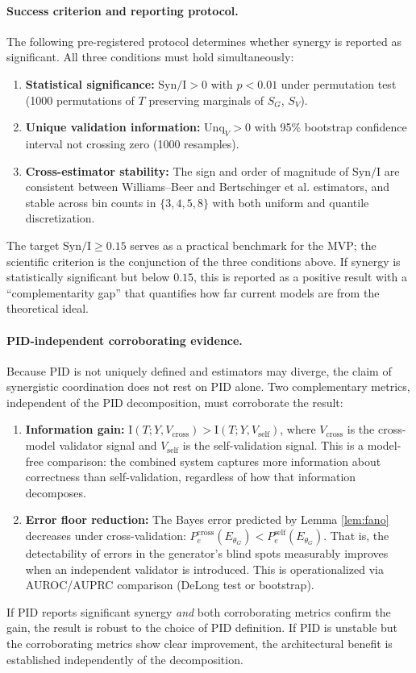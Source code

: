 \documentclass[11pt,a4paper]{article}
\theoremstyle{remark}
\newcommand{\Syn}{\mathrm{Syn}}
\newcommand{\Unq}{\mathrm{Unq}}
\newcommand{\MI}{\mathrm{I}}
\begin{document}
\paragraph{Success criterion and reporting protocol.} The following pre-registered protocol determines whether synergy is reported as significant. All three conditions must hold simultaneously:
\begin{enumerate}
  \item \textbf{Statistical significance:} $\Syn / \MI > 0$ with $p < 0.01$ under permutation test (1000 permutations of $T$ preserving marginals of $S_G$, $S_V$).
  \item \textbf{Unique validation information:} $\Unq_V > 0$ with 95\% bootstrap confidence interval not crossing zero (1000 resamples).
  \item \textbf{Cross-estimator stability:} The sign and order of magnitude of $\Syn / \MI$ are consistent between Williams--Beer \cite{williams2010pid} and Bertschinger et al. \cite{bertschinger2014pid} estimators, and stable across bin counts in $\{3, 4, 5, 8\}$ with both uniform and quantile discretization.
\end{enumerate}
The target $\Syn / \MI \geq 0.15$ serves as a practical benchmark for the MVP; the scientific criterion is the conjunction of the three conditions above. If synergy is statistically significant but below $0.15$, this is reported as a positive result with a ``complementarity gap'' that quantifies how far current models are from the theoretical ideal.

\paragraph{PID-independent corroborating evidence.} Because PID is not uniquely defined and estimators may diverge, the claim of synergistic coordination does not rest on PID alone. Two complementary metrics, independent of the PID decomposition, must corroborate the result:
\begin{enumerate}
  \item \textbf{Information gain:} $\MI(T; Y, V_{\mathrm{cross}}) > \MI(T; Y, V_{\mathrm{self}})$, where $V_{\mathrm{cross}}$ is the cross-model validator signal and $V_{\mathrm{self}}$ is the self-validation signal. This is a model-free comparison: the combined system captures more information about correctness than self-validation, regardless of how that information decomposes.
  \item \textbf{Error floor reduction:} The Bayes error predicted by Lemma \ref{lem:fano} decreases under cross-validation: $P_e^{\mathrm{cross}}(E_{\theta_G}) < P_e^{\mathrm{self}}(E_{\theta_G})$. That is, the detectability of errors in the generator's blind spots measurably improves when an independent validator is introduced. This is operationalized via AUROC/AUPRC comparison (DeLong test or bootstrap).
\end{enumerate}
If PID reports significant synergy \emph{and} both corroborating metrics confirm the gain, the result is robust to the choice of PID definition. If PID is unstable but the corroborating metrics show clear improvement, the architectural benefit is established independently of the decomposition.
\end{document}
